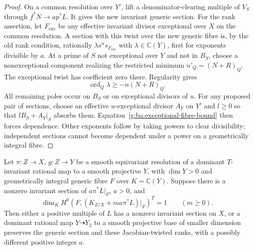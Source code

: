 \begin{proof}
On a common resolution over $Y'$, lift a denominator-clearing multiple
of $V_S$ through $f^*N\to ap^*L$.  It gives the new invariant generic
section. For the rank assertion, let $F_{\mathrm{exc}}$ be any effective
invariant divisor exceptional over $X$ on the common resolution.
A section with this twist over the new generic fibre is, by the old
rank condition, rationally
$\lambda s^n s_{F_{\mathrm{exc}}}$ with $\lambda\in\mathbb C(Y)$, first for exponents
divisible by $a$.  At a prime of $S$ not exceptional over $Y$ and not
in $B_S$, choose a nonexceptional component realizing the restricted
minimum $n'_Q=(N+R)_Q$.  The exceptional twist has coefficient zero
there.  Regularity gives
\[
                       \operatorname{ord}_Q\lambda
                                  \geq-n(N+R)_Q.
\]
All remaining poles occur on $B_S$ or on exceptional divisors of $u$.
For any proposed pair of sections, choose an effective $u$-exceptional
divisor $A_Y$ on $Y'$ and $l\geq0$ so that
$lB_S+A_Y|_S$ absorbs them. Equation~\eqref{g:ba:exceptional-fibre-bound}
then forces dependence.  Other exponents follow by taking powers to
clear divisibility; independent sections cannot become dependent under
a power on a geometrically integral fibre.
\end{proof}

\begin{proposition}
\label{g:ba:toroidal-contraction}
Let $\pi:Z\to X$, $g:Z\to Y$ be a smooth equivariant resolution
of a dominant $T$-invariant rational map to a smooth projective $Y$,
with $\dim Y>0$ and geometrically integral generic fibre
$F$ over $K=\mathbb C(Y)$. Suppose there is a nonzero invariant section
of $a\pi^*L|_F$, $a>0$, and
\[
 \dim_K H^0(F,(K_{Z/X}+ma\pi^*L)|_F)^T=1
                    \qquad(m\geq0).
\]
Then either a positive multiple of $L$ has a nonzero invariant section
on $X$, or a dominant rational map $Y\dashrightarrow Y_2$ to a smooth
projective base of smaller dimension preserves the generic section and
these Jacobian-twisted ranks, with a possibly different positive
integer $a$.
\end{proposition}

